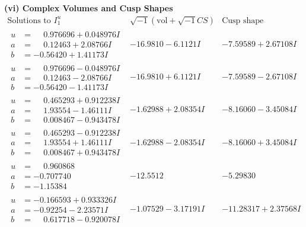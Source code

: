 \documentclass[1p]{elsarticle_modified}
\theoremstyle{definition}
\newcommand{\I}{\sqrt{-1}}
\begin{document}
\newpage\flushleft \textbf{(vi) Complex Volumes and Cusp Shapes}
$$\begin{array}{c|c|c}  
\text{Solutions to }I^u_{1}& \I (\text{vol} + \sqrt{-1}CS) & \text{Cusp shape}\\
 \hline 
\begin{aligned}
u &= \phantom{-}0.976696 + 0.048976 I \\
a &= \phantom{-}0.12463 + 2.08766 I \\
b &= -0.56420 + 1.41173 I\end{aligned}
 & -16.9810 - 6.1121 I & -7.59589 + 2.67108 I \\ \hline\begin{aligned}
u &= \phantom{-}0.976696 - 0.048976 I \\
a &= \phantom{-}0.12463 - 2.08766 I \\
b &= -0.56420 - 1.41173 I\end{aligned}
 & -16.9810 + 6.1121 I & -7.59589 - 2.67108 I \\ \hline\begin{aligned}
u &= \phantom{-}0.465293 + 0.912238 I \\
a &= \phantom{-}1.93554 - 1.46111 I \\
b &= \phantom{-}0.008467 - 0.943478 I\end{aligned}
 & -1.62988 + 2.08354 I & -8.16060 - 3.45084 I \\ \hline\begin{aligned}
u &= \phantom{-}0.465293 - 0.912238 I \\
a &= \phantom{-}1.93554 + 1.46111 I \\
b &= \phantom{-}0.008467 + 0.943478 I\end{aligned}
 & -1.62988 - 2.08354 I & -8.16060 + 3.45084 I \\ \hline\begin{aligned}
u &= \phantom{-}0.960868\phantom{ +0.000000I} \\
a &= -0.707740\phantom{ +0.000000I} \\
b &= -1.15384\phantom{ +0.000000I}\end{aligned}
 & -12.5512\phantom{ +0.000000I} & -5.29830\phantom{ +0.000000I} \\ \hline\begin{aligned}
u &= -0.166593 + 0.933326 I \\
a &= -0.92254 - 2.23571 I \\
b &= \phantom{-}0.617718 - 0.920078 I\end{aligned}
 & -1.07529 - 3.17191 I & -11.28317 + 2.37568 I \\ \hline\begin{aligned}

\end{aligned}
\end{array}$$
\end{document}
